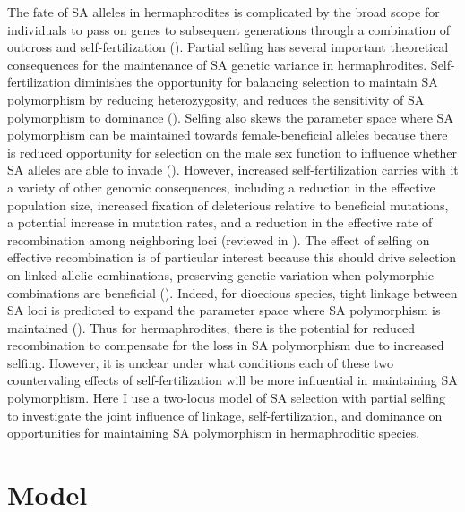 \documentclass{article}
\begin{document}
The fate of SA alleles in hermaphrodites is complicated by the broad scope for individuals to pass on genes to subsequent generations through a combination of outcross and self-fertilization (\citealt{Goodwillie2005, JarneAuld2006, JordanConn2014}). Partial selfing has several important theoretical consequences for the maintenance of SA genetic variance in hermaphrodites. Self-fertilization diminishes the opportunity for balancing selection to maintain SA polymorphism by reducing heterozygosity, and reduces the sensitivity of SA polymorphism to dominance (\citealt{JordanConn2014,Tazzyman2015}). Selfing also skews the parameter space where SA polymorphism can be maintained towards female-beneficial alleles because there is reduced opportunity for selection on the male sex function to influence whether SA alleles are able to invade (\citealt{JordanConn2014}). However, increased self-fertilization carries with it a variety of other genomic consequences, including a reduction in the effective population size, increased fixation of deleterious relative to beneficial mutations, a potential increase in mutation rates, and a reduction in the effective rate of recombination among neighboring loci (reviewed in \citealt{Wright2008}). The effect of selfing on effective recombination is of particular interest because this should drive selection on linked allelic combinations, preserving genetic variation when polymorphic combinations are beneficial (\citealt{CITE}). Indeed, for dioecious species, tight linkage between SA loci is predicted to expand the parameter space where SA polymorphism is maintained (\citealt{Patten2010}). Thus for hermaphrodites, there is the potential for reduced recombination to compensate for the loss in SA polymorphism due to increased selfing. However, it is unclear under what conditions each of these two countervaling effects of self-fertilization will be more influential in maintaining SA polymorphism. Here I use a two-locus model of SA selection with partial selfing to investigate the joint influence of linkage, self-fertilization, and dominance on opportunities for maintaining SA polymorphism in hermaphroditic species. 


\section*{Model}
\end{document}
